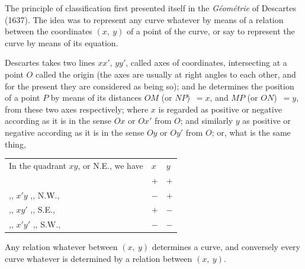 \documentclass[12pt,a4paper,oneside]{book}
\begin{document}
The principle of classification first presented itself in the \textit{G\'eom\'etrie} of Descartes (1637). The idea was to represent any curve whatever by means of a relation between the coordinates $(x,\ y)$ of a point of the curve, or say to represent the curve by means of its equation.

Descartes takes two lines $xx'$, $yy'$, called axes of coordinates, intersecting at a point $O$ called the origin (the axes are usually at right angles to each other, and for the present they are considered as being so); and he determines the position of a point $P$ by means of its distances $OM$ (or $NP$)~$=x$, and $MP$ (or $ON$)~$=y$, from these two axes respectively; where $x$ is regarded as positive or negative according as it is in the sense $Ox$ or $Ox'$ from $O$; and similarly $y$ as positive or negative according as it is in the sense $Oy$ or $Oy'$ from $O$; or, what is the same thing,
\begin{center}
\begin{tabular}{lll}
In the quadrant $xy$, or N.E., we have & $x$ & $y$ \\
                                           & $+$ & $+$ \\
\quad ,, \quad $x'y$ \quad ,, N.W., & $-$ & $+$ \\
\quad ,, \quad $xy'$ \quad ,, S.E., & $+$ & $-$ \\
\quad ,, \quad $x'y'$ \quad ,, S.W., & $-$ & $-$
\end{tabular}
\end{center}

Any relation whatever between $(x,\ y)$ determines a curve, and conversely every curve whatever is determined by a relation between $(x,\ y)$.
\end{document}
